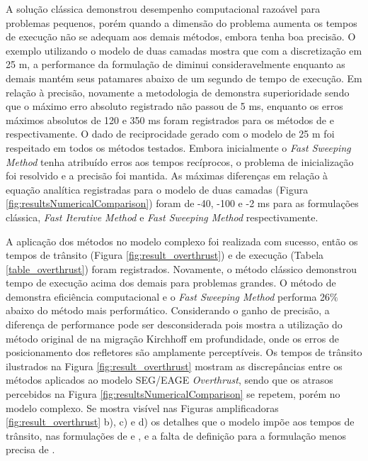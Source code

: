A solução clássica demonstrou desempenho computacional razoável para problemas pequenos, porém quando a dimensão do problema aumenta os tempos de execução não se adequam aos demais métodos, embora tenha boa precisão. O exemplo utilizando o modelo de duas camadas mostra que com a discretização em 25 m, a performance da formulação de  diminui consideravelmente enquanto as demais mantém seus patamares abaixo de um segundo de tempo de execução. Em relação à precisão, novamente a metodologia de  demonstra superioridade sendo que o máximo erro absoluto registrado não passou de 5 ms, enquanto os erros máximos absolutos de 120 e 350 ms foram registrados para os métodos de  e  respectivamente. O dado de reciprocidade gerado com o modelo de 25 m foi respeitado em todos os métodos testados. Embora inicialmente o \textit{Fast Sweeping Method} tenha atribuído erros aos tempos recíprocos, o problema de inicialização foi resolvido e a precisão foi mantida. As máximas diferenças em relação à equação analítica registradas para o modelo de duas camadas (Figura \ref{fig:resultsNumericalComparison}) foram de -40, -100 e -2 ms para as formulações clássica, \textit{Fast Iterative Method} e \textit{Fast Sweeping Method} respectivamente.         

A aplicação dos métodos no modelo complexo foi realizada com sucesso, então os tempos de trânsito (Figura \ref{fig:result_overthrust}) e de execução (Tabela \ref{table_overthrust}) foram registrados. Novamente, o método clássico demonstrou tempo de execução acima dos demais para problemas grandes. O método de  demonstra eficiência computacional e o \textit{Fast Sweeping Method} performa 26$\%$ abaixo do método mais performático. Considerando o ganho de precisão, a diferença de performance pode ser desconsiderada pois  mostra a utilização do método original de  na migração Kirchhoff em profundidade, onde os erros de posicionamento dos refletores são amplamente perceptíveis.  Os tempos de trânsito ilustrados na Figura \ref{fig:result_overthrust} mostram as discrepâncias entre os métodos aplicados ao modelo SEG/EAGE \textit{Overthrust}, sendo que os atrasos percebidos na Figura \ref{fig:resultsNumericalComparison} se repetem, porém no modelo complexo. Se mostra visível nas Figuras amplificadoras \ref{fig:result_overthrust} b), c) e d) os detalhes que o modelo impõe aos tempos de trânsito, nas formulações de  e , e a falta de definição para a formulação menos precisa de .  
 

